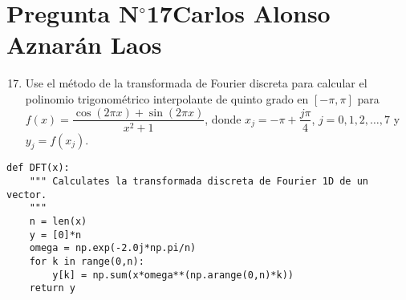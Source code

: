 \section{Pregunta N$^{\circ}$17\qquad Carlos Alonso Aznarán Laos}

\begin{frame}[fragile]
    \begin{enumerate}\setcounter{enumi}{16}
        \item

              Use el método de la transformada de Fourier discreta
              para calcular el polinomio trigonométrico interpolante
              de quinto grado en $\left[-\pi,\pi\right]$ para
              \begin{math}
                  f\left(x\right)=
                  \dfrac{
                      \cos\left(2\pi x\right)+
                      \sin\left(2\pi x\right)
                  }{x^{2}+1}
              \end{math},
              donde
              \begin{math}
                  x_{j}=
                  -\pi+
                  \dfrac{j\pi}{4}
              \end{math},
              \begin{math}
                  j=0,1,2,\dotsc,7
              \end{math}
              y
              \begin{math}
                  y_{j}=
                  f\left(x_{j}\right)
              \end{math}.
    \end{enumerate}

    \begin{solution}
\begin{verbatim}
def DFT(x):
    """ Calculates la transformada discreta de Fourier 1D de un vector.
    """
    n = len(x)
    y = [0]*n
    omega = np.exp(-2.0j*np.pi/n)
    for k in range(0,n):
        y[k] = np.sum(x*omega**(np.arange(0,n)*k))
    return y
\end{verbatim}
    \end{solution}
\end{frame}

